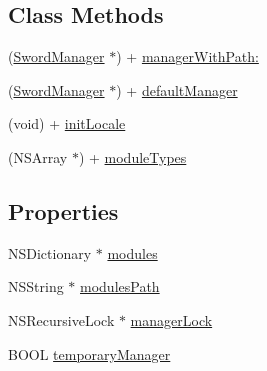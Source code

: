 \subsection*{Class Methods}
\begin{DoxyCompactItemize}
\item 
(\hyperlink{interface_sword_manager}{Sword\-Manager} $\ast$) + \hyperlink{interface_sword_manager_a76e1fa281ca3e38e522ec1aac75872b0}{manager\-With\-Path\-:}
\item 
(\hyperlink{interface_sword_manager}{Sword\-Manager} $\ast$) + \hyperlink{interface_sword_manager_a8131ac6ccc7bf11e7b7aabe8a6d4ba14}{default\-Manager}
\item 
(void) + \hyperlink{interface_sword_manager_a29752bb636bcd290cbfa6a443446f33b}{init\-Locale}
\item 
(N\-S\-Array $\ast$) + \hyperlink{interface_sword_manager_a6380c1752b94ca25f1810f2bcd365833}{module\-Types}
\end{DoxyCompactItemize}
\subsection*{Properties}
\begin{DoxyCompactItemize}
\item 
N\-S\-Dictionary $\ast$ \hyperlink{interface_sword_manager_a281f6d11d15ea61d2d0aa49a9ed046b4}{modules}
\item 
N\-S\-String $\ast$ \hyperlink{interface_sword_manager_aa7d416dd4dc46d4975463066f7cf15b8}{modules\-Path}
\item 
N\-S\-Recursive\-Lock $\ast$ \hyperlink{interface_sword_manager_a30dcad661c1ead69f05828725d6a205d}{manager\-Lock}
\item 
B\-O\-O\-L \hyperlink{interface_sword_manager_a4242622569ad00cbb80aa23107c38791}{temporary\-Manager}
\end{DoxyCompactItemize}


